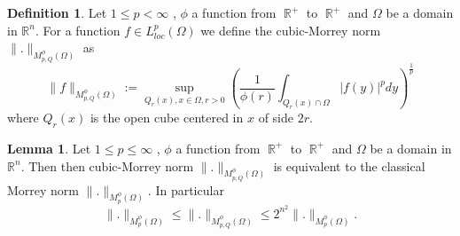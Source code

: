 \documentclass[12pt]{article}
\theoremstyle{definition}
\newtheorem{definition}{Definition}
\newtheorem{lemma}{Lemma}
\DeclareMathOperator\rr{\mathbb{R}}
\begin{document}
\begin{definition}
Let $1\le p< \infty$ , $\phi$ a function from $\rr^+$ to $\rr^+$ and $\Omega$ be a domain in $\mathbb{R}^n$. For a function $f \in L^p_{loc}(\Omega)$ we define the cubic-Morrey norm $\| .\|_{M_{p,Q}^\phi(\Omega)}$ as
\[ \|f\|_{M_{p,Q}^\phi(\Omega)}:=\sup_{Q_r(x), x \in \Omega,r>0} \left(  \frac{1}{\phi(r)}\int_{Q_r(x)\cap \Omega} |f(y)|^p dy \right )^{\frac{1}{p}}\]
where $Q_r(x)$ is the open cube centered in $x$ of side $2r$.
\end{definition}
\begin{lemma}
Let $1\le p\le \infty$ , $\phi$ a function from $\rr^+$ to $\rr^+$ and $\Omega$ be a domain in $\mathbb{R}^n$. Then then cubic-Morrey norm $\| .\|_{M_{p,Q}^\phi(\Omega)}$ is equivalent to the classical Morrey norm $\|.\|_{M_{p}^\phi(\Omega)}$. In particular 
\[ \| .\|_{M_{p}^\phi(\Omega)} \le \| .\|_{M_{p,Q}^\phi(\Omega)}\le 2^{n^2}\| .\|_{M_{p}^\phi(\Omega)}.\]
\end{lemma}
\end{document}
